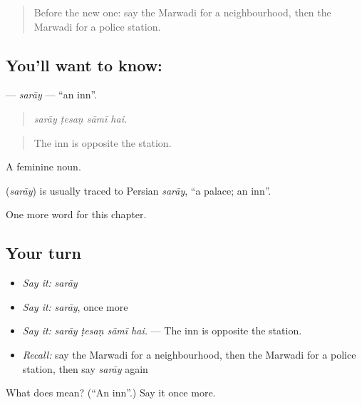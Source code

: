 \label{lesson:MW-C201-saray}



\begin{quote}
Before the new one: say the Marwadi for a neighbourhood, then the Marwadi for a police station.
\end{quote}

\subsection*{You'll want to know: }
\textbf{} — \emph{sarāy} — \textquotedblleft{}an inn\textquotedblright{}.

\begin{quote}
   
\end{quote}

\begin{quote}
\emph{sarāy ṭesaṇ sāmī hai.}
\end{quote}

\begin{quote}
The inn is opposite the station.
\end{quote}

A feminine noun.

\begin{cousinweb}
\textbf{} (\emph{sarāy}) is usually traced to Persian \emph{sarāy}, \textquotedblleft{}a palace; an inn\textquotedblright{}.
\end{cousinweb}

\begin{grammarlens}[title={What you've built}]
One more word for this chapter.
\end{grammarlens}

\subsection*{Your turn}
\begin{itemize}
\raggedright
  \item \emph{Say it:} \emph{sarāy}
  \item \emph{Say it:} \emph{sarāy}, once more
  \item \emph{Say it:} \emph{sarāy ṭesaṇ sāmī hai.} — The inn is opposite the station.
  \item \emph{Recall:} say the Marwadi for a neighbourhood, then the Marwadi for a police station, then say \emph{sarāy} again
\end{itemize}

\begin{tcolorbox}[breakable,colback=teal!4,colframe=teal!35!black,title={Before you move on}]
What does  mean? (\textquotedblleft{}An inn\textquotedblright{}.) Say it once more.
\end{tcolorbox}
